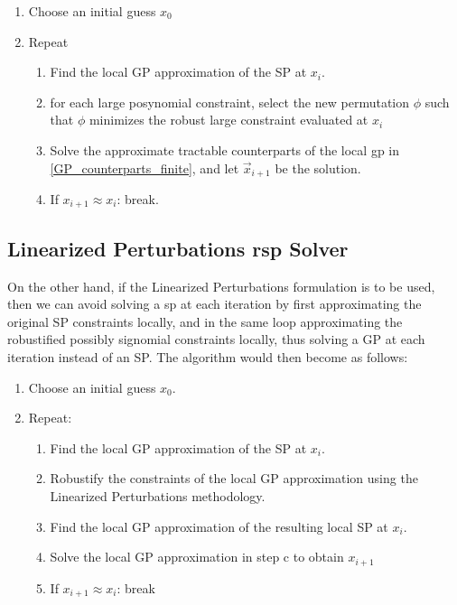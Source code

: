 \begin{enumerate}
    \item Choose an initial guess $x_0$
    \item Repeat
    \begin{enumerate}
        \item Find the local GP approximation of the SP at $x_i$.
        \item for each large posynomial constraint, select the new permutation $\phi$
                such that $\phi$ minimizes the robust large constraint evaluated at $x_i$
        \item Solve the approximate tractable counterparts of the local \gls{gp} in
                \eqref{GP_counterparts_finite}, and let $\vec{x}_{i+1}$ be the solution.
        \item If $x_{i+1} \approx x_{i}$: break.
    \end{enumerate}
\end{enumerate}

\subsection{Linearized Perturbations \gls{rsp} Solver}

On the other hand, if the Linearized Perturbations formulation is to be used,
then we can avoid solving a \gls{sp} at each iteration by first
approximating the original SP constraints locally, and in the same loop approximating
the robustified possibly signomial constraints locally, thus solving a
GP at each iteration instead of an SP. The algorithm would then become as follows:

\begin{enumerate}
    \item Choose an initial guess $x_0$.
    \item Repeat:
    \begin{enumerate}
        \item Find the local GP approximation of the SP at $x_i$.
        \item Robustify the constraints of the local GP approximation using the Linearized Perturbations methodology.
        \item Find the local GP approximation of the resulting local SP at $x_i$.
        \item Solve the local GP approximation in step c to obtain $x_{i+1}$
        \item If $x_{i+1} \approx x_{i}$: break
    \end{enumerate}
\end{enumerate}
